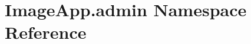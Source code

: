 \hypertarget{namespace_image_app_1_1admin}{}\section{Image\+App.\+admin Namespace Reference}
\label{namespace_image_app_1_1admin}
